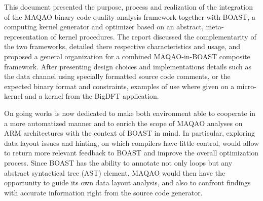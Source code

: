 \documentclass[11pt, a4paper, twoside]{montblanc2}
\begin{document}
This document presented the purpose, process and realization of the integration 
of the MAQAO binary code quality analysis framework together with BOAST, a 
computing kernel generator and optimizer based on an abstract, 
meta-representation of kernel procedures. The report discussed the 
complementarity of the two frameworks, detailed there respective characteristics 
and usage, and proposed a general organization for a combined MAQAO-in-BOAST 
composite framework. After presenting design choices and implementations details 
such as the data channel using specially formatted source code comments, or the 
expected binary format and constraints, examples of use where given on a 
micro-kernel and a kernel from the BigDFT application.

On going works is now dedicated to make both environment able to cooperate in a 
more automatized manner and to enrich the scope of MAQAO analyses on ARM 
architectures with the context of BOAST in mind. In particular, exploring data 
layout issues and hinting, on which compilers have little control, would allow 
to return more relevant feedback to BOAST and improve the overall optimization 
process. Since BOAST has the ability to annotate not only loops but any abstract 
syntactical tree (AST) element, MAQAO would then have the opportunity to 
guide its own data layout analysis, and also to confront findings with accurate 
information right from the source code generator.



\end{document}
